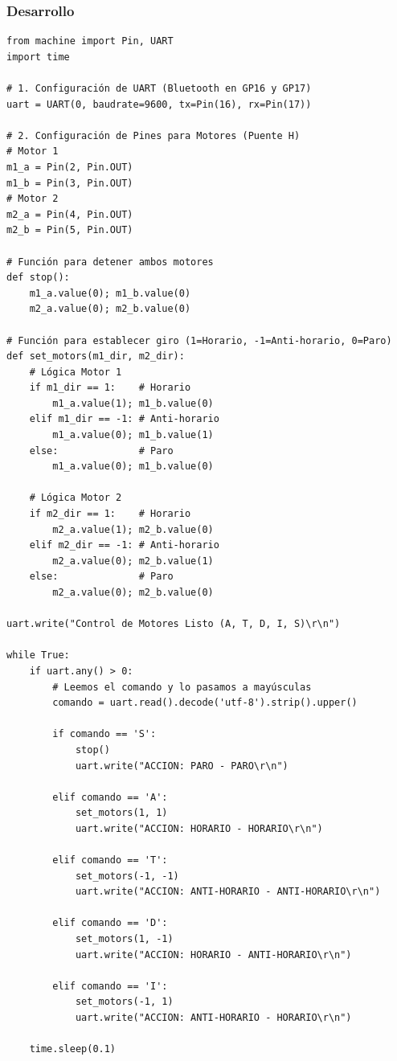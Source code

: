 \subsubsection{Desarrollo}
\begin{lstlisting}
from machine import Pin, UART
import time

# 1. Configuración de UART (Bluetooth en GP16 y GP17)
uart = UART(0, baudrate=9600, tx=Pin(16), rx=Pin(17))

# 2. Configuración de Pines para Motores (Puente H)
# Motor 1
m1_a = Pin(2, Pin.OUT)
m1_b = Pin(3, Pin.OUT)
# Motor 2
m2_a = Pin(4, Pin.OUT)
m2_b = Pin(5, Pin.OUT)

# Función para detener ambos motores
def stop():
    m1_a.value(0); m1_b.value(0)
    m2_a.value(0); m2_b.value(0)

# Función para establecer giro (1=Horario, -1=Anti-horario, 0=Paro)
def set_motors(m1_dir, m2_dir):
    # Lógica Motor 1
    if m1_dir == 1:    # Horario
        m1_a.value(1); m1_b.value(0)
    elif m1_dir == -1: # Anti-horario
        m1_a.value(0); m1_b.value(1)
    else:              # Paro
        m1_a.value(0); m1_b.value(0)
        
    # Lógica Motor 2
    if m2_dir == 1:    # Horario
        m2_a.value(1); m2_b.value(0)
    elif m2_dir == -1: # Anti-horario
        m2_a.value(0); m2_b.value(1)
    else:              # Paro
        m2_a.value(0); m2_b.value(0)

uart.write("Control de Motores Listo (A, T, D, I, S)\r\n")

while True:
    if uart.any() > 0:
        # Leemos el comando y lo pasamos a mayúsculas
        comando = uart.read().decode('utf-8').strip().upper()
        
        if comando == 'S':
            stop()
            uart.write("ACCION: PARO - PARO\r\n")
            
        elif comando == 'A':
            set_motors(1, 1)
            uart.write("ACCION: HORARIO - HORARIO\r\n")
            
        elif comando == 'T':
            set_motors(-1, -1)
            uart.write("ACCION: ANTI-HORARIO - ANTI-HORARIO\r\n")
            
        elif comando == 'D':
            set_motors(1, -1)
            uart.write("ACCION: HORARIO - ANTI-HORARIO\r\n")
            
        elif comando == 'I':
            set_motors(-1, 1)
            uart.write("ACCION: ANTI-HORARIO - HORARIO\r\n")

    time.sleep(0.1)
\end{lstlisting}

